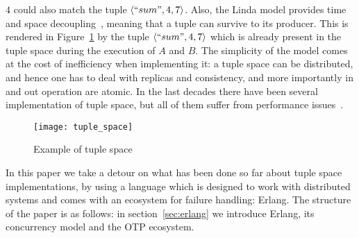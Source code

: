  $4$ could also match the tuple $\langle ``sum",4,7 \rangle$. Also, the Linda model provides time and  space decoupling~\cite{EugsterFGK03}, meaning that a tuple can survive to its producer. This is rendered in Figure~\ref{fig:example} by the tuple $\langle ``sum",4,7 \rangle$ which is already present in the tuple space during the execution of $A$ and $B$. The simplicity of the model comes at the cost of inefficiency when implementing it: a tuple space can be distributed, and hence one has to deal with replicas and consistency, and more importantly in and out operation are atomic. In the last decades there have been several implementation of tuple space, but all of them suffer from performance issues~\cite{BuravlevNM18}.
 
 \begin{figure}
\centering
 	\texttt{[image: tuple\_space]}
	\label{fig:example}
	\caption{Example of tuple space}
 \end{figure}
 
  In this paper we take a detour on what has been done so far about tuple space implementations, by using a language which is designed to work with distributed systems and comes with an ecosystem for failure handling: Erlang. The structure of the paper is as follows: in section~\ref{sec:erlang} we introduce Erlang, its concurrency model and the OTP ecosystem. %

